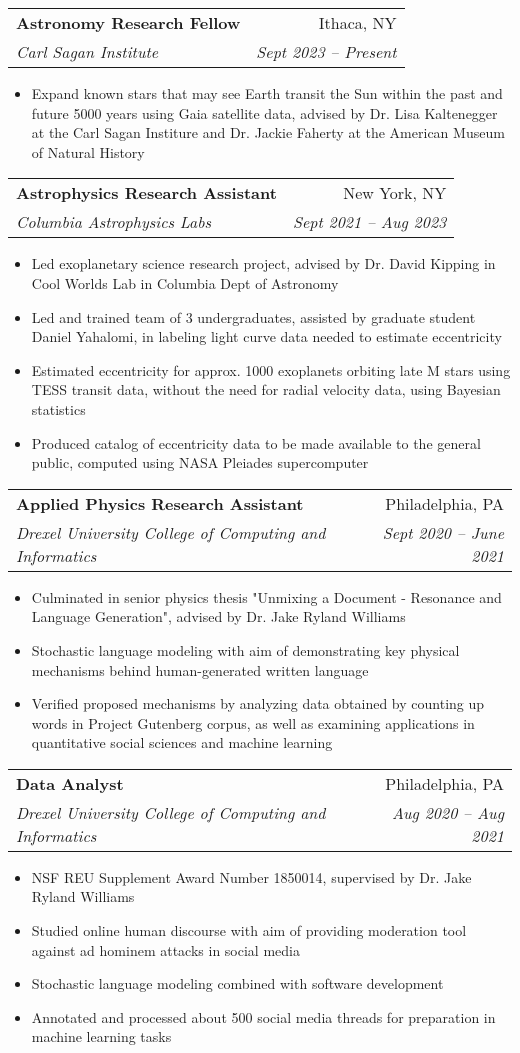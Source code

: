 \documentclass[a4paper,11pt]{article}
\makeatletter
\newcommand{\resumeItem}[1]{
  \item\small{
    {#1 \vspace{-2pt}}
  }
}
\newcommand{\resumeSubheading}[4]{
  \vspace{-2pt}\item
    \begin{tabular*}{0.97\textwidth}[t]{l@{\extracolsep{\fill}}r}
      \textbf{#1} & #2 \\
      \textit{\small#3} & \textit{\small #4} \\
    \end{tabular*}\vspace{-7pt}
}
\newcommand{\resumeItemListStart}{\begin{itemize}}
\newcommand{\resumeItemListEnd}{\end{itemize}\vspace{-5pt}}
\makeatother
\begin{document}
  \resumeSubheading
      {Astronomy Research Fellow}{Ithaca, NY}
      {Carl Sagan Institute}{Sept 2023 -- Present}
      \resumeItemListStart
        \resumeItem{Expand known stars that may see Earth transit the Sun within the past and future 5000 years using Gaia satellite data, advised by Dr. Lisa Kaltenegger at the Carl Sagan Institure and Dr. Jackie Faherty at the American Museum of Natural History}
      \resumeItemListEnd

    \resumeSubheading
      {Astrophysics Research Assistant}{New York, NY}
      {Columbia Astrophysics Labs}{Sept 2021 -- Aug 2023}
      \resumeItemListStart
        \resumeItem{Led exoplanetary science research project, advised by Dr. David Kipping
        in Cool Worlds Lab in Columbia Dept of Astronomy}
        \resumeItem{Led and trained team of 3 undergraduates, assisted by graduate student Daniel Yahalomi, in labeling light curve data needed to estimate eccentricity}
        \resumeItem{Estimated eccentricity for approx. 1000 exoplanets orbiting late M stars using TESS transit data, without the need for radial velocity data, using Bayesian statistics}
        \resumeItem{Produced catalog of eccentricity data to be made available to the general public, computed using NASA Pleiades supercomputer}
      \resumeItemListEnd
  
    \resumeSubheading
      {Applied Physics Research Assistant}{Philadelphia, PA}
      {Drexel University College of Computing and Informatics}{Sept 2020 -- June 2021}
      \resumeItemListStart
        \resumeItem{Culminated in senior physics thesis "Unmixing a Document - Resonance and Language Generation", advised by Dr. Jake Ryland Williams}
        \resumeItem{Stochastic language modeling with aim of demonstrating key physical mechanisms behind human-generated written language}
        \resumeItem{Verified proposed mechanisms by analyzing data obtained by counting up words in Project Gutenberg corpus, as well as examining applications in quantitative social sciences and machine learning}
      \resumeItemListEnd

    \resumeSubheading
      {Data Analyst}{Philadelphia, PA}
      {Drexel University College of Computing and Informatics}{Aug 2020 -- Aug 2021}
      \resumeItemListStart
        \resumeItem{NSF REU Supplement Award Number 1850014, supervised by Dr. Jake Ryland Williams}
        \resumeItem{Studied online human discourse with aim of providing moderation tool against ad hominem attacks in social media}
        \resumeItem{Stochastic language modeling combined with software development}
        \resumeItem{Annotated and processed about 500 social media threads for preparation in machine learning tasks}
      \resumeItemListEnd
      
\end{document}
